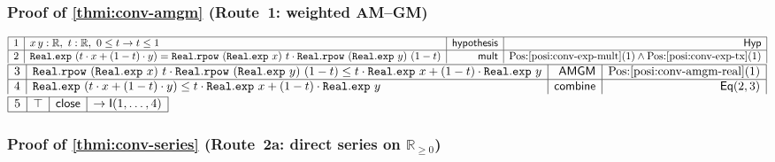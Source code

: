 \documentclass[11pt,reqno]{amsart}
\providecommand{\R}{\mathbb{R}}
\theoremstyle{redplain}
\numberwithin{equation}{section}
\begin{document}
\subsubsection*{Proof of \autoref{thmi:conv-amgm} (Route~1: weighted AM--GM)}

\begin{center}
$%
\begin{array}{|c|l|r|r|}
\hline
1 & x\,y:\mathbb{R},\ t:\mathbb{R},\ 0\leq t\rightarrow t\leq 1 & \mathsf{%
hypothesis} & \mathsf{Hyp} \\ \hline
2 & \mathtt{Real.exp}\ (t\cdot x+(1-t)\cdot y)=\mathtt{Real.rpow}\ (\mathtt{%
Real.exp}\ x)\ t\cdot \mathtt{Real.rpow}\ (\mathtt{Real.exp}\ y)\ (1-t) & 
\mathsf{mult} & \mbox{Pos:\ref{posi:conv-exp-mult}(1)}\wedge %
\mbox{Pos:\ref{posi:conv-exp-tx}(1)}%
\end{array}%
$ \noindent $%
\begin{array}{|c|l|r|r|}
\hline
3 & \mathtt{Real.rpow}\ (\mathtt{Real.exp}\ x)\ t\cdot \mathtt{Real.rpow}\ (%
\mathtt{Real.exp}\ y)\ (1-t)\leq t\cdot \mathtt{Real.exp}\ x+(1-t)\cdot 
\mathtt{Real.exp}\ y & \mathsf{AMGM} & \mbox{Pos:%
\ref{posi:conv-amgm-real}(1)} \\ \hline
4 & \mathtt{Real.exp}\ (t\cdot x+(1-t)\cdot y)\leq t\cdot \mathtt{Real.exp}\
x+(1-t)\cdot \mathtt{Real.exp}\ y & \mathsf{combine} & \mathsf{Eq}(2,3)%
\end{array}%
$ \noindent $%
\begin{array}{|c|l|r|r|}
\hline
5 & \top & \mathsf{close} & \rightarrow \mathsf{I}(1,\dots ,4) \\ \hline
\end{array}%
$
\end{center}

\subsubsection*{Proof of \autoref{thmi:conv-series} (Route~2a: direct series
on \texorpdfstring{$\R_{\ge0}$}{R\_geq0})}
\end{document}
